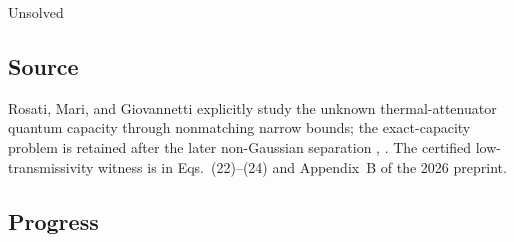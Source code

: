 Unsolved

\subsection*{Source}

Rosati, Mari, and Giovannetti explicitly study the unknown thermal-attenuator
quantum capacity through nonmatching narrow bounds; the exact-capacity
problem is retained after the later non-Gaussian separation
,
. The certified low-transmissivity witness is in Eqs.~(22)--(24) and Appendix~B of the 2026 preprint.

\subsection*{Progress}

